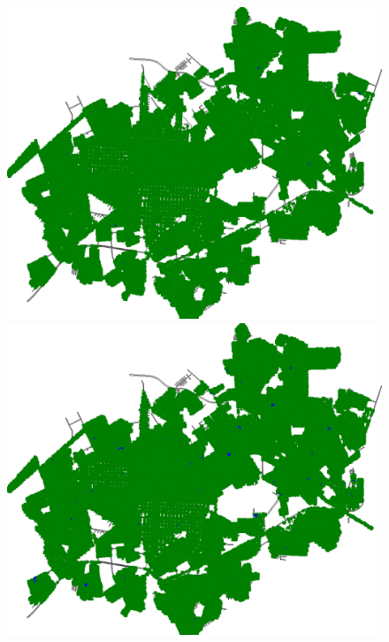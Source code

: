 \begin{figure}[H]
\begin{minipage}{.5\textwidth}
    \captionsetup{labelformat=empty}
  \end{minipage}
  \begin{minipage}{.5\textwidth}
    \centering
    \includegraphics[width=1.0\textwidth]{Figuras/Resultados/0002/Saidas/MonteCarlo_0/Simulacao_0/Espacial/00008.png}
    \captionsetup{labelformat=empty}
  \end{minipage}%
  \centering
  \begin{minipage}{.5\textwidth}
    \centering
    \includegraphics[width=1.0\textwidth]{Figuras/Resultados/0002/Saidas/MonteCarlo_0/Simulacao_0/Espacial/00012.png}

\end{minipage}
\end{figure}
